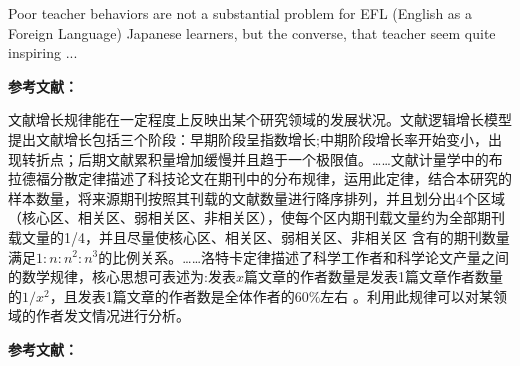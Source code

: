 \documentclass{article}
\newlength{\indentedpara}
\begin{document}
\eject


\pdfpagewidth=21cm \pdfpageheight=2.6cm

\begin{refsection}
Poor teacher behaviors are not a substantial problem for EFL (English as a Foreign Language) Japanese learners, but
the converse, that teacher seem quite inspiring \cite{gbt7714.9.3.1.2:1} ...

\textbf{参考文献：}

\parbox{2em}{}\parbox{\indentedpara}{\printbibliography[heading=none]}
\end{refsection}



\eject

\pdfpagewidth=21cm \pdfpageheight=8.4cm
\begin{refsection}

文献增长规律能在一定程度上反映出某个研究领域的发展状况。文献逻辑增长模型提出文献增长包括三个阶段：早期阶段呈指数增长;中期阶段增长率开始变小，出现转折点；后期文献累积量增加缓慢并且趋于一个极限值\cite{gbt7714.9.3.1.3:1}。……文献计量学中的布拉德福分散定律描述了科技论文在期刊中的分布规律，运用此定律，结合本研究的样本数量，将来源期刊按照其刊载的文献数量进行降序排列，并且划分出4个区域（核心区、相关区、弱相关区、非相关区），使每个区内期刊载文量约为全部期刊载文量的1/4，并且尽量使核心区、相关区、弱相关区、非相关区
含有的期刊数量满足$1:n:n^{2}:n^{3}$的比例关系\cite{gbt7714.9.3.1.3:2}。……洛特卡定律描述了科学工作者和科学论文产量之间的数学规律，核心思想可表述为:发表$x$篇文章的作者数量是发表1篇文章作者数量的$1/x^2$，且发表1篇文章的作者数是全体作者的60\%左右
\cite{gbt7714.9.3.1.3:3}。利用此规律可以对某领域的作者发文情况进行分析。

\textbf{参考文献：}

\newrefcontext[sorting=none]{}
\parbox{2em}{}\parbox{\indentedpara}{\printbibliography[heading=none]}
\end{refsection}
\end{document}
